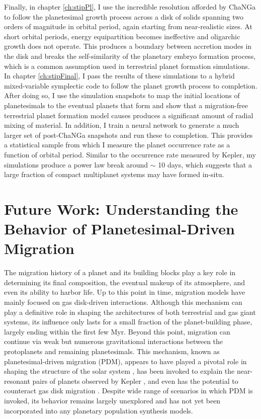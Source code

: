 Finally, in chapter \ref{ch:stipPl}, I use the incredible resolution afforded by {\sc ChaNGa} to follow the planetesimal growth process across a disk of solids spanning two orders of magnitude in orbital period, again starting from near-realistic sizes. At short orbital periods, energy equipartition becomes ineffective and oligarchic growth does not operate. This produces a boundary between accretion modes in the disk and breaks the self-similarity of the planetary embryo formation process, which is a common assumption used in terrestrial planet formation simulations. In chapter \ref{ch:stipFinal}, I pass the results of these simulations to a hybrid mixed-variable symplectic code to follow the planet growth process to completion. After doing so, I use the simulation snapshots to map the initial locations of planetesimals to the eventual planets that form and show that a migration-free terrestrial planet formation model causes produces a significant amount of radial mixing of material. In addition, I train a neural network to generate a much larger set of post-{\sc ChaNGa} snapshots and run these to completion. This provides a statistical sample from which I measure the planet occurrence rate as a function of orbital period. Similar to the occurrence rate measured by Kepler, my simulations produce a power law break around $\sim$ 10 days, which suggests that a large fraction of compact multiplanet systems may have formed in-situ.

\section{Future Work: Understanding the Behavior of Planetesimal-Driven Migration}

The migration history of a planet and its building blocks play a key role in determining its final composition, the eventual makeup of its atmosphere, and even its ability to harbor life. Up to this point in time, migration models have mainly focused on gas disk-driven interactions. Although this mechanism can play a definitive role in shaping the architectures of both terrestrial and gas giant systems, its influence only lasts for a small fraction of the planet-building phase, largely ending within the first few Myr. Beyond this point, migration can continue via weak but numerous gravitational interactions between the protoplanets and remaining planetesimals. This mechanism, known as planetesimal-driven migration (PDM), appears to have played a pivotal role in shaping the structure of the solar system \cite{tsiganis05, levison11, nesvorny11}, has been invoked to explain the near-resonant pairs of planets observed by Kepler \cite{chatterjee15}, and even has the potential to counteract gas disk migration \cite{minton14}. Despite wide range of scenarios in which PDM is invoked, its behavior remains largely unexplored and has not yet been incorporated into any planetary population synthesis models. 

